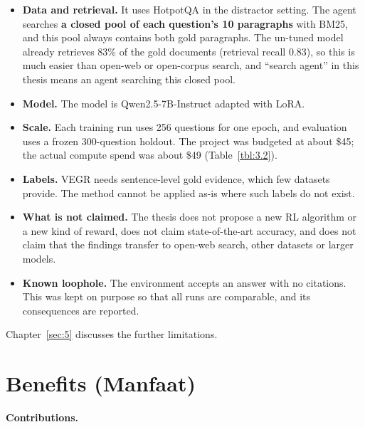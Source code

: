 \begin{itemize}
\tightlist
\item
  \textbf{Data and retrieval.} It uses HotpotQA in the distractor
  setting. The agent searches \textbf{a closed pool of each question's
  10 paragraphs} with BM25, and this pool always contains both gold
  paragraphs. The un-tuned model already retrieves 83\% of the gold
  documents (retrieval recall 0.83), so this is much easier than
  open-web or open-corpus search, and ``search agent'' in this thesis
  means an agent searching this closed pool.
\item
  \textbf{Model.} The model is Qwen2.5-7B-Instruct adapted with LoRA.
\item
  \textbf{Scale.} Each training run uses 256 questions for one epoch,
  and evaluation uses a frozen 300-question holdout. The project was
  budgeted at about \$45; the actual compute spend was about \$49
  (Table~\ref{tbl:3.2}).
\item
  \textbf{Labels.} VEGR needs sentence-level gold evidence, which few
  datasets provide. The method cannot be applied as-is where such labels
  do not exist.
\item
  \textbf{What is not claimed.} The thesis does not propose a new RL
  algorithm or a new kind of reward, does not claim state-of-the-art
  accuracy, and does not claim that the findings transfer to open-web
  search, other datasets or larger models.
\item
  \textbf{Known loophole.} The environment accepts an answer with no
  citations. This was kept on purpose so that all runs are comparable,
  and its consequences are reported.
\end{itemize}

Chapter~\ref{sec:5} discusses the further limitations.

\section{Benefits (Manfaat)}\label{sec:1.5}

\textbf{Contributions.}

